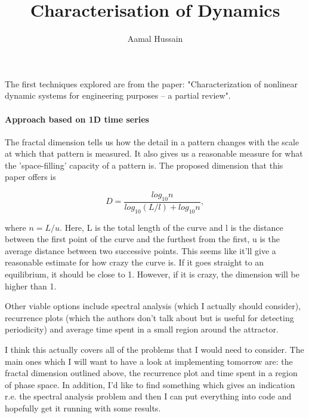 \documentclass{article}
\title{Characterisation of Dynamics}
\author{Aamal Hussain}
\date{}
\begin{document}
    \maketitle

    The first techniques explored are from the paper: "Characterization of nonlinear dynamic systems
    for engineering purposes – a partial review". 

    \paragraph*{Approach based on 1D time series}

    The fractal dimension tells us how the detail in a pattern changes with the scale at which that
    pattern is measured. It also gives us a reasonable measure for what the 'space-filling' capacity
    of a pattern is. The proposed dimension that this paper offers is 

    \begin{equation}
        D = \frac{log_{10} n}{log_{10} (L/l) + log_{10}n},
    \end{equation}

    where $n = L/u$. Here, L is the total length of the curve and l is the distance between the
    first point of the curve and the furthest from the first, u is the average distance between two
    successive points. This seems like it'll give a reasonable estimate for how crazy the curve is.
    If it goes straight to an equilibrium, it should be close to 1. However, if it is crazy, the
    dimension will be higher than 1.
    
    Other viable options include spectral analysis (which I actually should consider), recurrence
    plots (which the authors don't talk about but is useful for detecting periodicity) and average
    time spent in a small region around the attractor.

    

    I think this actually covers all of the problems that I would need to consider. The main ones
    which I will want to have a look at implementing tomorrow are: the fractal dimension outlined
    above, the recurrence plot and time spent in a region of phase space. In addition, I'd like to
    find something which gives an indication r.e. the spectral analysis problem and then I can put
    everything into code and hopefully get it running with some results.
\end{document}
